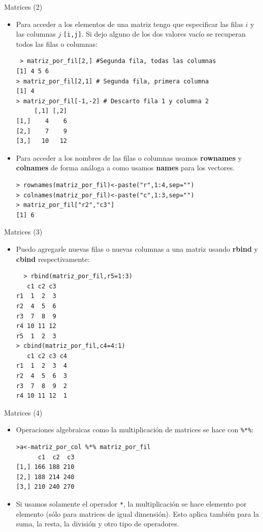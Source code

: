 \documentclass[handout]{beamer}
\begin{document}
\begin{frame}[fragile]{Matrices (2)}
\scriptsize{
 \begin{itemize}
  \item Para acceder a los elementos de una matriz tengo que especificar las filas $i$ y las columnas $j$ \verb+[i,j]+. Si dejo alguno de los dos valores vacío se recuperan todos las filas o columnas: 
 \begin{verbatim}
 > matriz_por_fil[2,] #Segunda fila, todas las columnas
[1] 4 5 6
> matriz_por_fil[2,1] # Segunda fila, primera columna
[1] 4
> matriz_por_fil[-1,-2] # Descarto fila 1 y columna 2
     [,1] [,2]
[1,]    4    6
[2,]    7    9
[3,]   10   12 
 \end{verbatim}
\item Para acceder a los nombres de las filas o columnas usamos \textbf{rownames} y \textbf{colnames} de forma análoga a como usamos \textbf{names} para los vectores.
\begin{verbatim}
> rownames(matriz_por_fil)<-paste("r",1:4,sep="")
> colnames(matriz_por_fil)<-paste("c",1:3,sep="")
> matriz_por_fil["r2","c3"]
[1] 6
\end{verbatim}  
 \end{itemize}
 }
\end{frame}


\begin{frame}[fragile]{Matrices (3)}
\scriptsize{
\begin{itemize}
 \item Puedo agregarle nuevas filas o nuevas columnas a una matriz usando \textbf{rbind} y \textbf{cbind} respectivamente:
 \begin{verbatim}
  > rbind(matriz_por_fil,r5=1:3)
   c1 c2 c3
r1  1  2  3
r2  4  5  6
r3  7  8  9
r4 10 11 12
r5  1  2  3
> cbind(matriz_por_fil,c4=4:1)
   c1 c2 c3 c4
r1  1  2  3  4
r2  4  5  6  3
r3  7  8  9  2
r4 10 11 12  1
 \end{verbatim}

\end{itemize}
 
 
 
} 
\end{frame}

\begin{frame}[fragile]{Matrices (4)}
\scriptsize{
\begin{itemize}
 \item Operaciones algebraicas como la multiplicación de matrices se hace con \verb+%*%+:
 \begin{verbatim}
>a<-matriz_por_col %*% matriz_por_fil
      c1  c2  c3
[1,] 166 188 210
[2,] 188 214 240
[3,] 210 240 270
 \end{verbatim}

 
\item  Si usamos solamente el operador \verb+*+, la multiplicación se hace elemento por elemento (sólo para matrices de igual dimensión). Esto aplica también para la suma, la resta, la división y otro tipo de operadores.

\end{itemize}


 
}

\end{frame}
\end{document}
